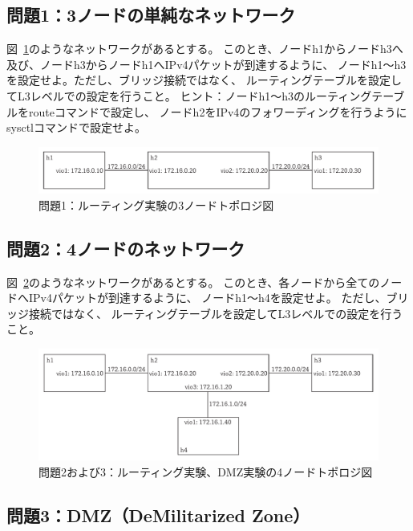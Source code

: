 
\subsection{問題1：3ノードの単純なネットワーク}

図~\ref{fig:quiz01}のようなネットワークがあるとする。
このとき、ノードh1からノードh3へ及び、ノードh3からノードh1へIPv4パケットが到達するように、
ノードh1〜h3を設定せよ。ただし、ブリッジ接続ではなく、
ルーティングテーブルを設定してL3レベルでの設定を行うこと。
ヒント：ノードh1〜h3のルーティングテーブルをrouteコマンドで設定し、
ノードh2をIPv4のフォワーディングを行うようにsysctlコマンドで設定せよ。

\begin{figure}
    \centering
    \includegraphics[width=15cm,pagebox=artbox]{figs/quiz01.pdf}
    \caption{問題1：ルーティング実験の3ノードトポロジ図} \label{fig:quiz01}
\end{figure}

\subsection{問題2：4ノードのネットワーク}

図~\ref{fig:quiz02}のようなネットワークがあるとする。
このとき、各ノードから全てのノードへIPv4パケットが到達するように、
ノードh1〜h4を設定せよ。
ただし、ブリッジ接続ではなく、
ルーティングテーブルを設定してL3レベルでの設定を行うこと。

\begin{figure}
    \centering
    \includegraphics[width=15cm,pagebox=artbox]{figs/quiz02.pdf}
    \caption{問題2および3：ルーティング実験、DMZ実験の4ノードトポロジ図} \label{fig:quiz02}
\end{figure}

\subsection{問題3：DMZ（DeMilitarized Zone）}

